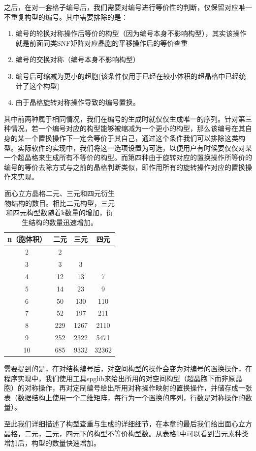 之后，在对一套格子编号后，我们需要对编号进行等价性的判断，仅保留对应唯一不重复构型的编号。其中需要排除的是：
\begin{enumerate}
  \item 编号的轮换对称操作后等价的构型（因为编号本身不影响构型），其实该操作就是前面同类SNF矩阵对应晶胞的平移操作后的等价查重
  \item 编号的交换对称（编号本身不影响构型）
  \item 编号后可缩减为更小的超胞(该条件仅用于已经在较小体积的超晶格中已经统计了这个构型)
  \item 由于晶格旋转对称操作导致的编号置换。
\end{enumerate}
其中前两种属于相同情况，我们在编号的生成时就仅仅生成唯一的序列。针对第三种情况，若一个编号对应的构型能够被缩减为一个更小的构型，那么该编号在其自身的某一个置换操作下一定会等价于其自己，通过这个条件我们可以排除这类构型。实际软件的实现中，我们将这一选项设置为可选，以便用户有时候要仅仅对某一个超晶格来生成所有不等价的构型。而第四种由于旋转对应的置换操作所等价的编号的等价去除方式与之前的晶格判断类似，即作用所有的旋转操作对应的置换操作来实现。

\begin{table}[htb!]
  \centering
  \begin{tabular}{cccc}
    \hline\hline
    n（胞体积） & 二元 & 三元 & 四元 \\
    \hline
    2 & 2      &         &            \\
    3 & 3      &     3    &            \\
    4 & 12      &    13     &    7        \\
    5 & 14      &    23     &    9        \\
    6 & 50      &     130    &    110        \\
    7 & 52      &      197   &      211      \\
    8 & 229      &     1267    &      2110      \\
    9 & 252      &     2322    &       5471     \\
    10 & 685      &    9332     &      32362      \\
    \hline\hline
  \end{tabular}
  \caption{面心立方晶格二元、三元和四元衍生物结构的数目。相比二元构型，三元和四元构型数随着k数量的增加，衍生结构的数量迅速增加。}
  \label{table:derive_structures_num}
\end{table}

需要提到的是，在对结构编号后，对空间构型的操作会变为对编号的置换操作，在程序实现中，我们使用工具spglib\cite{togo2018texttt}来给出所用的对空间构型（超晶胞下而非原晶胞）的对称操作，再对定制编号给出所用对称操作映射的置换操作，并储存成一张表（数据结构上使用一个二维矩阵，每行为一个置换的序列，行数是对称操作的数量）。

至此我们详细描述了构型查重与生成的详细细节，在本章的最后我们给出面心立方晶格，二元，三元，四元下的构型不等价构型数。从表格\ref{table:derive_structures_num}中可以看到当元素种类增加后，构型的数量快速增加。
